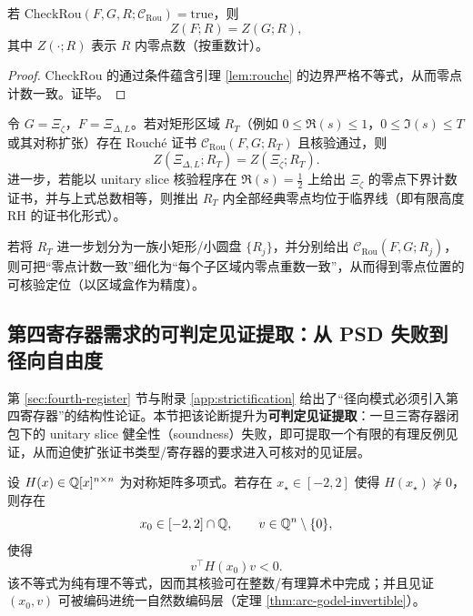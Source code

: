 \begin{theorem}[有限区域零点计数的证书化]\label{thm:rouche-certified}
若 $\mathrm{CheckRou}(F,G,R;\mathcal{C}_{\mathrm{Rou}})=\mathrm{true}$，则
$$
Z(F;R)=Z(G;R),
$$
其中 $Z(\cdot;R)$ 表示 $R$ 内零点数（按重数计）。
\end{theorem}

\begin{proof}
$\mathrm{CheckRou}$ 的通过条件蕴含引理 \ref{lem:rouche} 的边界严格不等式，从而零点计数一致。证毕。
\end{proof}

\begin{corollary}\label{cor:bridge-finite-height-template}
令 $G=\Xi_\zeta$，$F=\Xi_{\Delta,L}$。若对矩形区域 $R_T$（例如 $0\le\Re(s)\le 1$，$0\le\Im(s)\le T$ 或其对称扩张）存在 Rouché 证书 $\mathcal{C}_{\mathrm{Rou}}(F,G;R_T)$ 且核验通过，则
$$
Z(\Xi_{\Delta,L};R_T)=Z(\Xi_\zeta;R_T).
$$
进一步，若能以 unitary slice 核验程序在 $\Re(s)=\tfrac12$ 上给出 $\Xi_\zeta$ 的零点下界计数证书，并与上式总数相等，则推出 $R_T$ 内全部经典零点均位于临界线（即有限高度 RH 的证书化形式）。
\end{corollary}

\begin{remark}
若将 $R_T$ 进一步划分为一族小矩形/小圆盘 $\{R_j\}$，并分别给出 $\mathcal{C}_{\mathrm{Rou}}(F,G;R_j)$，则可把“零点计数一致”细化为“每个子区域内零点重数一致”，从而得到零点位置的可核验定位（以区域盒作为精度）。
\end{remark}

\subsection{第四寄存器需求的可判定见证提取：从 PSD 失败到径向自由度}\label{app:witness-fourth-register}

第 \ref{sec:fourth-register} 节与附录 \ref{app:strictification} 给出了“径向模式必须引入第四寄存器”的结构性论证。本节把该论断提升为\textbf{可判定见证提取}：一旦三寄存器闭包下的 unitary slice 健全性（soundness）失败，即可提取一个有限的有理反例见证，从而迫使扩张证书类型/寄存器的要求进入可核对的见证层。

\begin{theorem}\label{thm:psd-failure-witness}
设 $H(x)\in\mathbb{Q}[x]^{n\times n}$ 为对称矩阵多项式。若存在 $x_\star\in[-2,2]$ 使得 $H(x_\star)\not\succeq 0$，则存在
$$
x_0\in[-2,2]\cap\mathbb{Q},\qquad v\in\mathbb{Q}^n\setminus\{0\},
$$
使得
$$
v^\top H(x_0)v<0.
$$
该不等式为纯有理不等式，因而其核验可在整数/有理算术中完成；并且见证 $(x_0,v)$ 可被编码进统一自然数编码层（定理 \ref{thm:arc-godel-invertible}）。
\end{theorem}

